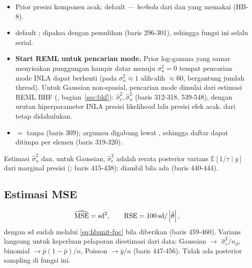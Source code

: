 \begin{itemize}
  \item Prior presisi komponen acak:  default
         --- \emph{berbeda} dari
         dan  yang memakai
         (HB-8).
  \item {} default ;  dipaksa
         dengan pemulihan  (baris 296-301),
        sehingga fungsi ini selalu serial.
  \item \textbf{Start REML untuk pencarian mode.} Prior log-gamma yang samar
        menyisakan punggungan hampir datar menuju $\sigma_u^2=0$ tempat
        pencarian mode INLA dapat berhenti (pada 
        $\sigma_u^2\approx1$ alih-alih $\approx60$, bergantung jumlah
        thread). Untuk Gaussian non-spasial, pencarian mode dimulai dari
        estimasi REML BHF (, bagian~\ref{sec:bhf}):
        $\hat\sigma_e^2,\hat\sigma_u^2$
        (baris 312-318,  539-548), dengan urutan
        hiperparameter INLA presisi likelihood lalu presisi efek acak.
         dari  tetap didahulukan.
  \item {} $=$  tanpa
         (baris 309); argumen  digabung
        lewat , sehingga daftar  dapat
        ditimpa per elemen (baris 319-320).
\end{itemize}
Estimasi $\hat\sigma_u^2$ dan, untuk Gaussian, $\hat\sigma_e^2$ adalah rerata
posterior varians $\mathbb E[1/\tau\mid y]$ dari marginal presisi
(; baris 415-438);  diambil bila ada
(baris 440-444).

\subsection{Estimasi MSE}\label{sec:hbunit-mse}

\begin{equation}
  \widehat{\mathrm{MSE}}=\mathrm{sd}^2,
  \qquad
  \mathrm{RSE}=100\,\mathrm{sd}/\left|\hat\theta\right|,
  \label{eq:hbunit-mse}
\end{equation}
dengan $\mathrm{sd}$ sudah melalui \eqref{eq:hbunit-fpc} bila
 diberikan (baris 459-460). Varians langsung untuk
keperluan pelaporan diestimasi dari data: Gaussian $\to$
$\hat\sigma_e^2/n_d$, binomial $\to\bar p(1-\bar p)/n$, Poisson
$\to\bar y/n$ (baris 447-456). Tidak ada posterior sampling di fungsi ini.

